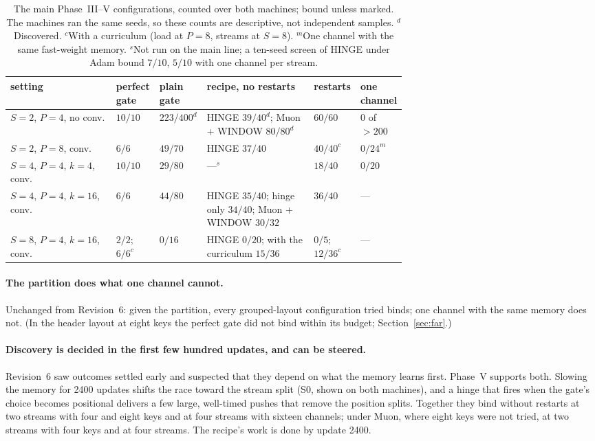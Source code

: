 \documentclass[11pt]{article}
\begin{document}
\begin{table}[h]
\centering
\footnotesize
\setlength{\tabcolsep}{4pt}
\begin{tabular}{@{}l>{\centering\arraybackslash}p{0.09\linewidth}>{\centering\arraybackslash}p{0.11\linewidth}>{\raggedright\arraybackslash}p{0.27\linewidth}>{\centering\arraybackslash}p{0.11\linewidth}>{\centering\arraybackslash}p{0.09\linewidth}@{}}
\toprule
setting & perfect gate & plain gate & recipe, no restarts & restarts & one channel\\
\midrule
$S{=}2$, $P{=}4$, no conv. & $10/10$ & $223/400^{d}$ & HINGE $39/40^{d}$; Muon + WINDOW $80/80^{d}$ & $60/60$ & $0$ of $>200$\\
$S{=}2$, $P{=}8$, conv. & $6/6$ & $49/70$ & HINGE $37/40$ & $40/40^{c}$ & $0/24^{m}$\\
$S{=}4$, $P{=}4$, $k{=}4$, conv. & $10/10$ & $29/80$ & ---$^{s}$ & $18/40$ & $0/20$\\
$S{=}4$, $P{=}4$, $k{=}16$, conv. & $6/6$ & $44/80$ & HINGE $35/40$; hinge only $34/40$; Muon + WINDOW $30/32$ & $36/40$ & ---\\
$S{=}8$, $P{=}4$, $k{=}16$, conv. & $2/2$; $6/6^{c}$ & $0/16$ & HINGE $0/20$; with the curriculum $15/36$ & $0/5$; $12/36^{c}$ & ---\\
\bottomrule
\end{tabular}
\caption{The main Phase~III--V configurations, counted over both machines; bound unless marked. The machines ran the same seeds, so these counts are descriptive, not independent samples. $^{d}$Discovered. $^{c}$With a curriculum (load at $P = 8$, streams at $S = 8$). $^{m}$One channel with the same fast-weight memory. $^{s}$Not run on the main line; a ten-seed screen of HINGE under Adam bound $7/10$, $5/10$ with one channel per stream.}
\label{tab:synthesis}
\end{table}

\paragraph{The partition does what one channel cannot.} Unchanged from Revision~6: given the partition, every grouped-layout configuration tried binds; one channel with the same memory does not. (In the header layout at eight keys the perfect gate did not bind within its budget; Section~\ref{sec:far}.)

\paragraph{Discovery is decided in the first few hundred updates, and can be steered.} Revision~6 saw outcomes settled early and suspected that they depend on what the memory learns first. Phase~V supports both. Slowing the memory for 2400 updates shifts the race toward the stream split (S0, shown on both machines), and a hinge that fires when the gate's choice becomes positional delivers a few large, well-timed pushes that remove the position splits. Together they bind without restarts at two streams with four and eight keys and at four streams with sixteen channels; under Muon, where eight keys were not tried, at two streams with four keys and at four streams. The recipe's work is done by update 2400.
\end{document}
